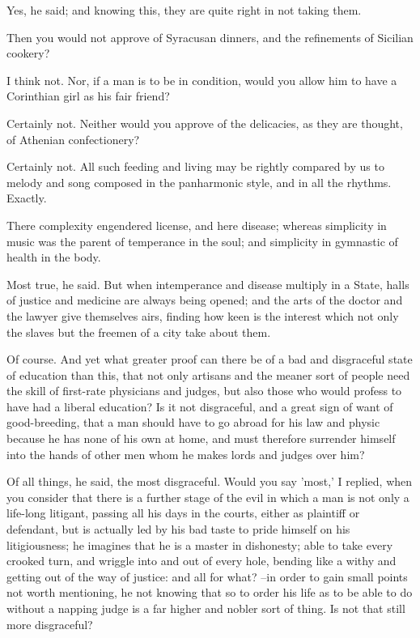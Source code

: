 Yes, he said; and knowing this, they are quite right in not taking them.

Then you would not approve of Syracusan dinners, and the refinements of Sicilian cookery?

I think not.
Nor, if a man is to be in condition, would you allow him to have a Corinthian girl as his fair friend?

Certainly not.
Neither would you approve of the delicacies, as they are thought, of Athenian confectionery?

Certainly not.
All such feeding and living may be rightly compared by us to melody and song composed in the panharmonic style, and in all the rhythms. Exactly.

There complexity engendered license, and here disease; whereas simplicity in music was the parent of temperance in the soul; and simplicity in gymnastic of health in the body.

Most true, he said.
But when intemperance and disease multiply in a State, halls of justice and medicine are always being opened; and the arts of the doctor and the lawyer give themselves airs, finding how keen is the interest which not only the slaves but the freemen of a city take about them.

Of course.
And yet what greater proof can there be of a bad and disgraceful state of education than this, that not only artisans and the meaner sort of people need the skill of first-rate physicians and judges, but also those who would profess to have had a liberal education? Is it not disgraceful, and a great sign of want of good-breeding, that a man should have to go abroad for his law and physic because he has none of his own at home, and must therefore surrender himself into the hands of other men whom he makes lords and judges over him?

Of all things, he said, the most disgraceful.
Would you say 'most,' I replied, when you consider that there is a further stage of the evil in which a man is not only a life-long litigant, passing all his days in the courts, either as plaintiff or defendant, but is actually led by his bad taste to pride himself on his litigiousness; he imagines that he is a master in dishonesty; able to take every crooked turn, and wriggle into and out of every hole, bending like a withy and getting out of the way of justice: and all for what? --in order to gain small points not worth mentioning, he not knowing that so to order his life as to be able to do without a napping judge is a far higher and nobler sort of thing. Is not that still more disgraceful?

